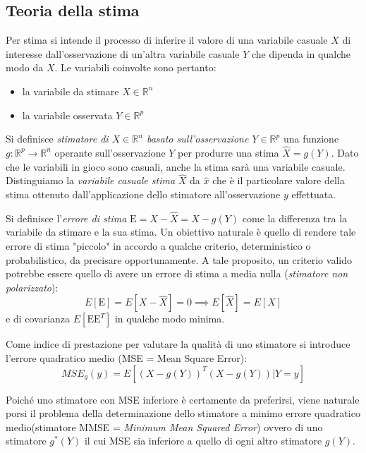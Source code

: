 \subsection{Teoria della stima}
Per stima si intende il processo di inferire il valore di una variabile casuale $X$ di interesse dall'osservazione di un'altra variabile casuale $Y$ che dipenda in qualche modo da $X$. Le variabili coinvolte sono pertanto:
\begin{itemize}
	\item la variabile da stimare $X \in \mathbb{R}^n$
	\item la variabile osservata $Y \in \mathbb{R}^p$
\end{itemize}

Si definisce \textit{stimatore di $X \in \mathbb{R}^n$ basato sull’osservazione $Y \in \mathbb{R}^p$} una funzione $g:\mathbb{R}^p \rightarrow \mathbb{R}^n$ operante sull'osservazione $Y$ per produrre una stima $\widehat{X}=g(Y)$.
Dato che le variabili in gioco sono casuali, anche la stima sarà una variabile casuale. Distinguiamo la \textit{variabile casuale stima} $\widehat{X}$ da $\hat{x}$ che è il particolare valore della stima ottenuto dall'applicazione dello stimatore all'osservazione $y$ effettuata.

Si definisce l'\textit{errore di stima} $\mathrm{E}=X-\widehat{X}=X-g(Y)$ come la differenza tra la variabile da stimare e la sua stima. Un obiettivo naturale è quello di rendere tale errore di stima "piccolo" in accordo
a qualche criterio, deterministico o probabilistico, da precisare opportunamente. A tale
proposito, un criterio valido potrebbe essere quello di avere un errore di stima a media
nulla (\textit{stimatore non polarizzato}):
\[E[\mathrm{E}]=E[X-\widehat{X}]=0 \implies E[\widehat{X}]=E[X]\]
e di covarianza $E[\mathrm{E}\mathrm{E}^T]$ in qualche modo minima.

Come indice di prestazione per valutare la qualità di uno stimatore si introduce l’errore quadratico medio (MSE = Mean Square Error):
\begin{equation}
MSE_g(y)= E[(X-g(Y))^T(X-g(Y))|Y=y]
\end{equation}

Poiché uno stimatore con MSE inferiore è certamente da preferirsi, viene naturale porsi il problema della determinazione dello stimatore a minimo errore quadratico medio(stimatore MMSE = \textit{Minimum Mean Squared Error}) ovvero di uno stimatore $g^*(Y)$ il cui MSE sia inferiore a quello di ogni altro stimatore $g(Y)$.

